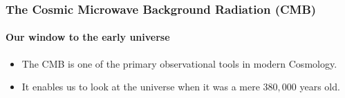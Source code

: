 \begin{frame}
\frametitle{The Cosmic Microwave Background Radiation (CMB)}
\framesubtitle{Our window to the early universe}
\begin{itemize}
\pause\item The CMB is one of the primary observational tools in modern Cosmology.
\pause\item It enables us to look at the universe when it was a mere $380,000$ years old.
\end{itemize}
\end{frame}
